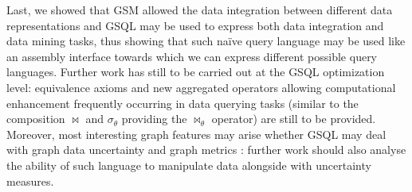 Last, we showed that  GSM allowed the data integration between different data representations and GSQL may be used to express both data integration and data mining tasks, thus showing that such naïve query language may be used like an assembly interface towards which we can express different possible query languages. Further work has still to be carried out at the GSQL optimization level: equivalence axioms and new aggregated operators allowing computational enhancement frequently occurring in data querying tasks (similar to the composition $\bowtie$ and $\sigma_\theta$ providing the $\bowtie_\theta$ operator) are still to be provided. Moreover, most interesting graph features may arise whether GSQL may deal with graph data uncertainty \cite{Getoor07} and graph metrics \cite{DMR}: further work should also analyse the ability of such language to manipulate data alongside with uncertainty measures.